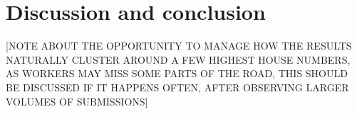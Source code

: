 \section{Discussion and conclusion}

[NOTE ABOUT THE OPPORTUNITY TO MANAGE HOW THE RESULTS NATURALLY CLUSTER AROUND A FEW HIGHEST HOUSE NUMBERS, AS WORKERS MAY MISS SOME PARTS OF THE ROAD, THIS SHOULD BE DISCUSSED IF IT HAPPENS OFTEN, AFTER OBSERVING LARGER VOLUMES OF SUBMISSIONS]